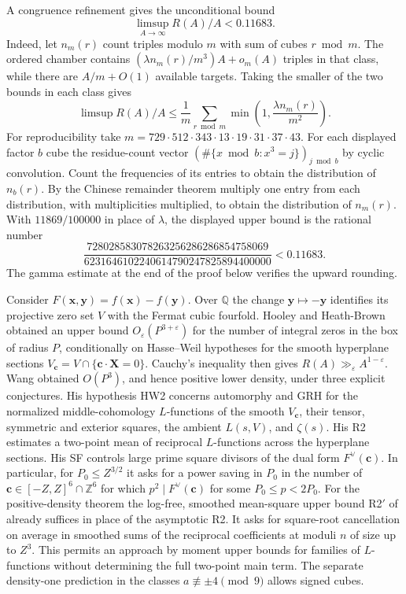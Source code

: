 \documentclass[11pt,letterpaper]{article}
\theoremstyle{definition}
\begin{document}
A congruence refinement gives the unconditional bound
\begin{equation}\label{c3:upper}
 \limsup_{A\to\infty}R(A)/A<0.11683 .
\end{equation}
Indeed, let $n_m(r)$ count triples modulo $m$ with sum of cubes
$r\bmod m$. The ordered chamber contains
$(\lambda n_m(r)/m^3)A+o_m(A)$ triples in that class, while there are
$A/m+O(1)$ available targets. Taking the smaller of the two bounds in
each class gives
\[
 \limsup R(A)/A\le \frac1m\sum_{r\bmod m}
          \min\!\left(1,\frac{\lambda n_m(r)}{m^2}\right).
\]
For reproducibility take $m=729\cdot512\cdot343\cdot13\cdot19\cdot31
\cdot37\cdot43$. For each displayed factor $b$ cube the residue-count
vector $(\#\{x\bmod b:x^3=j\})_{j\bmod b}$ by cyclic convolution.
Count the frequencies of its entries to obtain the distribution of
$n_b(r)$. By the Chinese remainder theorem multiply one entry from each
distribution, with multiplicities multiplied, to obtain the distribution
of $n_m(r)$. With $11869/100000$ in place of $\lambda$, the displayed
upper bound is the rational number
\[
 \frac{728028583078263256286286854758069}
      {6231646102240614790247825894400000}<0.11683 .
\]
The gamma estimate at the end of the proof below verifies the upward rounding.

Consider $F(\mathbf{x},\mathbf{y})=f(\mathbf{x})-f(\mathbf{y})$.
Over $\mathbb Q$ the change $\mathbf y\mapsto-\mathbf y$ identifies its
projective zero set $V$ with the Fermat cubic fourfold. Hooley and
Heath-Brown \cite{c3:hooley,c3:hooleyk,c3:hb} obtained an upper bound
$O_\varepsilon(P^{3+\varepsilon})$ for the number of integral zeros in the
box of radius $P$, conditionally on Hasse--Weil hypotheses for the smooth
hyperplane sections $V_{\mathbf c}=V\cap\{\mathbf c\cdot\mathbf X=0\}$.
Cauchy's inequality then gives $R(A)\gg_\varepsilon A^{1-\varepsilon}$.
Wang \cite[Theorem 1.7]{c3:wang} obtained $O(P^3)$, and hence positive
lower density, under three explicit conjectures. His hypothesis HW2 concerns
automorphy and GRH for the normalized middle-cohomology $L$-functions of
the smooth $V_{\mathbf c}$, their tensor, symmetric and exterior squares,
the ambient $L(s,V)$, and $\zeta(s)$. His R2 estimates a two-point
mean of reciprocal $L$-functions across the hyperplane sections.
His SF controls large prime square divisors of the dual form $F^\vee(\mathbf c)$.
In particular, for $P_0\le Z^{3/2}$ it asks for a power saving in $P_0$ in
the number of $\mathbf c\in[-Z,Z]^6\cap\mathbb Z^6$ for which
$p^2\mid F^\vee(\mathbf c)$ for some $P_0\le p<2P_0$.
For the positive-density theorem the log-free, smoothed mean-square
upper bound R2$'$ of \cite[Conjecture 6.4 and Remark 6.5]{c3:wang}
already suffices in place of the asymptotic R2. It asks for square-root
cancellation on average in smoothed sums of the reciprocal coefficients
at moduli $n$ of size up to $Z^3$. This permits an approach by moment
upper bounds for families of $L$-functions without determining the full
two-point main term. The separate density-one prediction in the classes $a\not\equiv\pm4\pmod9$
allows signed cubes.
\end{document}
